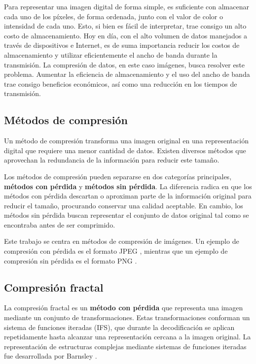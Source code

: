 \documentclass[a4paper]{llncs}
\begin{document}
Para representar una imagen digital de forma simple, es suficiente con almacenar cada uno de los píxeles, de forma ordenada, junto con el valor de color o intensidad de cada uno. Esto, si bien es fácil de interpretar, trae consigo un alto costo de almacenamiento. Hoy en día, con el alto volumen de datos manejados a través de dispositivos e Internet, es de suma importancia reducir los costos de almacenamiento y utilizar eficientemente el ancho de banda durante la transmisión. La compresión de datos, en este caso imágenes, busca resolver este problema. Aumentar la eficiencia de almacenamiento y el uso del ancho de banda trae consigo beneficios económicos, así como una reducción en los tiempos de transmisión.
    
\subsection{Métodos de compresión}

Un método de compresión transforma una imagen original en una representación digital que requiere una menor cantidad de datos. Existen diversos métodos que aprovechan la redundancia de la información para reducir este tamaño.

Los métodos de compresión pueden separarse en dos categorías principales, \textbf{métodos con pérdida} y \textbf{métodos sin pérdida}. La diferencia radica en que los métodos con pérdida descartan o aproximan parte de la información original para reducir el tamaño, procurando conservar una calidad aceptable. En cambio, los métodos sin pérdida buscan representar el conjunto de datos original tal como se encontraba antes de ser comprimido.

Este trabajo se centra en métodos de compresión de imágenes. Un ejemplo de compresión con pérdida es el formato JPEG \cite{wallace1991}, mientras que un ejemplo de compresión sin pérdida es el formato PNG \cite{png2003}.

\subsection{Compresión fractal}
La compresión fractal es un \textbf{método con pérdida} que representa una imagen mediante un conjunto de transformaciones. Estas transformaciones conforman un sistema de funciones iteradas (IFS), que durante la decodificación se aplican repetidamente hasta alcanzar una representación cercana a la imagen original. La representación de estructuras complejas mediante sistemas de funciones iteradas fue desarrollada por Barnsley \cite{barnsley1988}.
\end{document}
